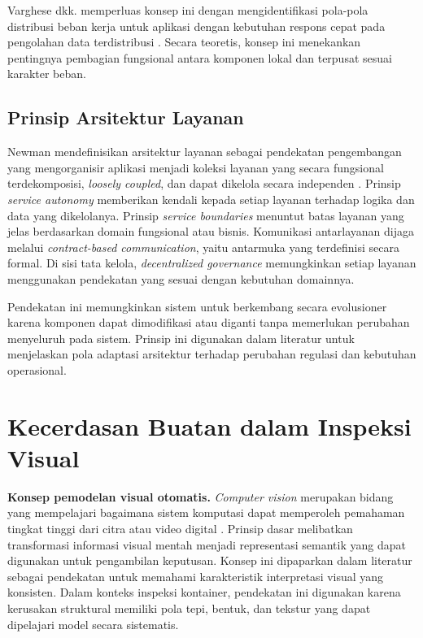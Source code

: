Varghese dkk. memperluas konsep ini dengan mengidentifikasi pola-pola distribusi beban kerja untuk aplikasi dengan kebutuhan respons cepat pada pengolahan data terdistribusi \autocite{varghese2016}. Secara teoretis, konsep ini menekankan pentingnya pembagian fungsional antara komponen lokal dan terpusat sesuai karakter beban.

\subsection{Prinsip Arsitektur Layanan}

Newman mendefinisikan arsitektur layanan sebagai pendekatan pengembangan yang
mengorganisir aplikasi menjadi koleksi layanan yang secara fungsional
terdekomposisi, \textit{loosely coupled}, dan dapat dikelola secara independen
\autocite{newman2015}. Prinsip \textit{service autonomy} memberikan kendali
kepada setiap layanan terhadap logika dan data yang dikelolanya. Prinsip
\textit{service boundaries} menuntut batas layanan yang jelas berdasarkan
domain fungsional atau bisnis. Komunikasi antarlayanan dijaga melalui
\textit{contract-based communication}, yaitu antarmuka yang terdefinisi secara
formal. Di sisi tata kelola, \textit{decentralized governance} memungkinkan
setiap layanan menggunakan pendekatan yang sesuai dengan kebutuhan domainnya.

Pendekatan ini memungkinkan sistem untuk berkembang secara evolusioner karena komponen dapat dimodifikasi atau diganti tanpa memerlukan perubahan menyeluruh pada sistem. Prinsip ini digunakan dalam literatur untuk menjelaskan pola adaptasi arsitektur terhadap perubahan regulasi dan kebutuhan operasional.

\section{Kecerdasan Buatan dalam Inspeksi Visual}

\textbf{Konsep pemodelan visual otomatis.}
\textit{Computer vision} merupakan bidang yang mempelajari bagaimana sistem komputasi dapat memperoleh pemahaman tingkat tinggi dari citra atau video digital \autocite{szeliski2022}. Prinsip dasar melibatkan transformasi informasi visual mentah menjadi representasi semantik yang dapat digunakan untuk pengambilan keputusan. Konsep ini dipaparkan dalam literatur sebagai pendekatan untuk memahami karakteristik interpretasi visual yang konsisten. Dalam konteks inspeksi kontainer, pendekatan ini digunakan karena kerusakan struktural memiliki pola tepi, bentuk, dan tekstur yang dapat dipelajari model secara sistematis.

